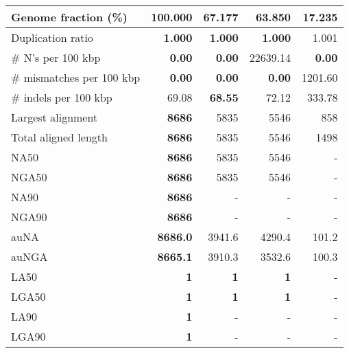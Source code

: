 \documentclass[12pt,a4paper]{article}
\begin{document}
\begin{table}[ht]
\begin{center}
\begin{tabular}{|l*{4}{|r}|}
Genome fraction (\%) & {\bf 100.000} & 67.177 & 63.850 & 17.235 \\ \hline
Duplication ratio & {\bf 1.000} & {\bf 1.000} & {\bf 1.000} & 1.001 \\ \hline
\# N's per 100 kbp & {\bf 0.00} & {\bf 0.00} & 22639.14 & {\bf 0.00} \\ \hline
\# mismatches per 100 kbp & {\bf 0.00} & {\bf 0.00} & {\bf 0.00} & 1201.60 \\ \hline
\# indels per 100 kbp & 69.08 & {\bf 68.55} & 72.12 & 333.78 \\ \hline
Largest alignment & {\bf 8686} & 5835 & 5546 & 858 \\ \hline
Total aligned length & {\bf 8686} & 5835 & 5546 & 1498 \\ \hline
NA50 & {\bf 8686} & 5835 & 5546 & - \\ \hline
NGA50 & {\bf 8686} & 5835 & 5546 & - \\ \hline
NA90 & {\bf 8686} & - & - & - \\ \hline
NGA90 & {\bf 8686} & - & - & - \\ \hline
auNA & {\bf 8686.0} & 3941.6 & 4290.4 & 101.2 \\ \hline
auNGA & {\bf 8665.1} & 3910.3 & 3532.6 & 100.3 \\ \hline
LA50 & {\bf 1} & {\bf 1} & {\bf 1} & - \\ \hline
LGA50 & {\bf 1} & {\bf 1} & {\bf 1} & - \\ \hline
LA90 & {\bf 1} & - & - & - \\ \hline
LGA90 & {\bf 1} & - & - & - \\ \hline
\end{tabular}
\end{center}
\end{table}
\end{document}
